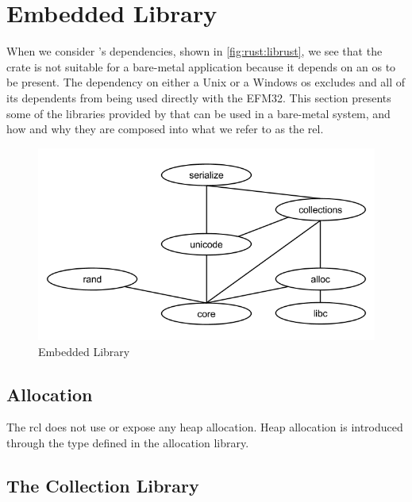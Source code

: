 \section{\rust Embedded Library}
\label{sec:rust_embedded_library}

When we consider {\std}'s dependencies, shown in \autoref{fig:rust:librust}, we see that the crate is not suitable for a bare-metal application because it depends on an \gls{os} to be present.
The dependency on either a Unix or a Windows \gls{os} excludes {\std} and all of its dependents from being used directly with the EFM32.
This section presents some of the libraries provided by {\rust} that can be used in a bare-metal system, and how and why they are composed into what we refer to as the \gls{rel}.

\begin{figure}[H]
  \begin{center}
    \includegraphics[scale=0.3]{figures/background/rust/embedded-rust-lib.png}
  \end{center}
  \caption{\rust Embedded Library}
  \label{fig:rust:rel}
\end{figure}

\subsection{Allocation}
\label{sec:rust:allocation}

The \gls{rcl} does not use or expose any heap allocation.
Heap allocation is introduced through the  type defined in the allocation library.

\subsection{The Collection Library}

